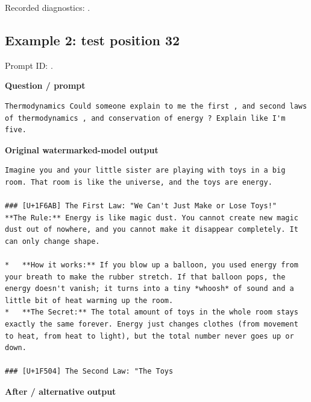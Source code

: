 Recorded diagnostics:
\texttt{}.

\subsection{Example 2: test position
32}\label{record-docs-watermarking-qualitative-text-textseal2-vanilla-md-example-2-test-position-32}

Prompt ID:
\texttt{}.

\textbf{Question / prompt}

\begin{Verbatim}
Thermodynamics Could someone explain to me the first , and second laws of thermodynamics , and conservation of energy ? Explain like I'm five.
\end{Verbatim}

\textbf{Original watermarked-model output}

\begin{Verbatim}
Imagine you and your little sister are playing with toys in a big room. That room is like the universe, and the toys are energy.

### [U+1F6AB] The First Law: "We Can't Just Make or Lose Toys!"
**The Rule:** Energy is like magic dust. You cannot create new magic dust out of nowhere, and you cannot make it disappear completely. It can only change shape.

*   **How it works:** If you blow up a balloon, you used energy from your breath to make the rubber stretch. If that balloon pops, the energy doesn't vanish; it turns into a tiny *whoosh* of sound and a little bit of heat warming up the room.
*   **The Secret:** The total amount of toys in the whole room stays exactly the same forever. Energy just changes clothes (from movement to heat, from heat to light), but the total number never goes up or down.

### [U+1F504] The Second Law: "The Toys
\end{Verbatim}

\textbf{After / alternative output}

